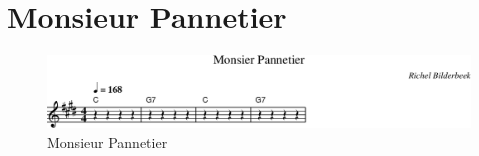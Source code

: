 \chapter{Monsieur Pannetier}



\begin{figure}[!htbp]
  \includegraphics[width=\textwidth,height=\textheight,keepaspectratio]{../songs/63_monsieur_pannetier.png}
  \caption{Monsieur Pannetier}
  \label{fig:63_monsieur_pannetier}
\end{figure}
